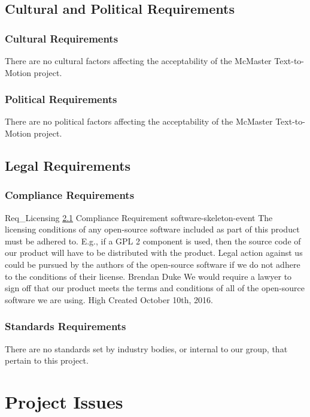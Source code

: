 \documentclass{scrreprt}
\begin{document}
\section{Cultural and Political Requirements}

\subsection{Cultural Requirements}

There are no cultural factors affecting the acceptability of the McMaster
Text-to-Motion project.

\subsection{Political Requirements}

There are no political factors affecting the acceptability of the McMaster
Text-to-Motion project.

\section{Legal Requirements}

\subsection{Compliance Requirements}
\label{req-compliance}

\requirement
{Req_Licensing}
{\ref{req-compliance} Compliance Requirement}
{software-skeleton-event}
{The licensing conditions of any open-source software included as part of this
product must be adhered to. E.g., if a GPL 2 component is used, then the source
code of our product will have to be distributed with the product.}
{Legal action against us could be pursued by the authors of the open-source
software if we do not adhere to the conditions of their license.}
{Brendan Duke}
{We would require a lawyer to sign off that our product meets the terms and
conditions of all of the open-source software we are using.}
{High}
{Created October 10th, 2016.}

\subsection{Standards Requirements}

There are no standards set by industry bodies, or internal to our group, that
pertain to this project.

\chapter{Project Issues}
\end{document}
